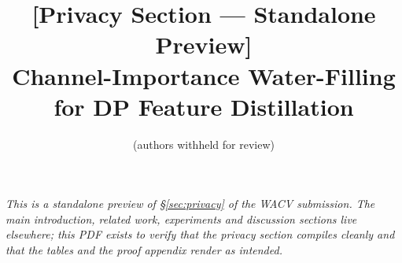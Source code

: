 \documentclass[10pt,letterpaper]{article}
\title{[Privacy Section — Standalone Preview]\\
       Channel-Importance Water-Filling for DP Feature Distillation}
\author{(authors withheld for review)}
\date{}
\begin{document}
\maketitle

\noindent\textit{This is a standalone preview of \S\ref{sec:privacy}
of the WACV submission. The main introduction, related work,
experiments and discussion sections live elsewhere; this PDF exists
to verify that the privacy section compiles cleanly and that the
tables and the proof appendix render as intended.}


\end{document}
